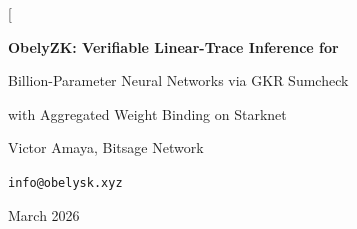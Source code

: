 \documentclass[10pt,twocolumn]{article}
\theoremstyle{definition}
\theoremstyle{remark}
\begin{document}
\makeatletter
\twocolumn[
\begin{@twocolumnfalse}
\begin{center}
  {\LARGE\bfseries ObelyZK: Verifiable Linear-Trace Inference for\par
   \vspace{4pt}
   Billion-Parameter Neural Networks via GKR Sumcheck\par
   \vspace{4pt}
   with Aggregated Weight Binding on Starknet}

  \vspace{12pt}

  {\large Victor Amaya, Bitsage Network}\par
  \vspace{4pt}
  {\small\texttt{info@obelysk.xyz}}

  \vspace{8pt}

  {\small March 2026}

  \vspace{10pt}


\end{center}
\end{@twocolumnfalse}
\end{document}
